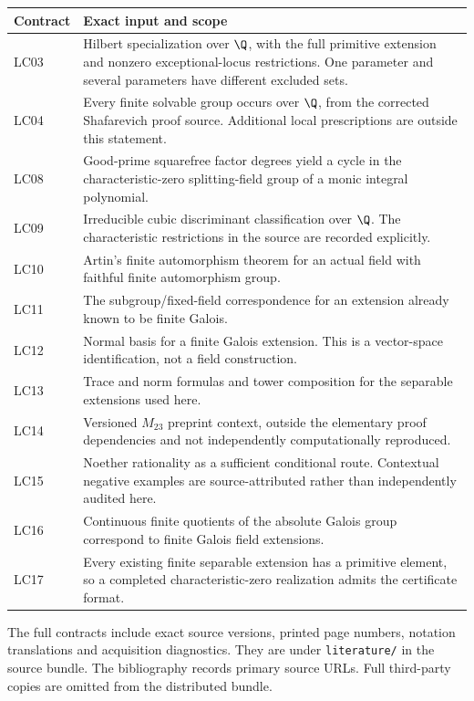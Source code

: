 \begin{longtable}{@{}p{.12\linewidth}p{.79\linewidth}@{}}
\toprule Contract & Exact input and scope\\\midrule\endhead
LC03 & Hilbert specialization over $\Q$, with the full primitive extension and nonzero exceptional-locus restrictions. One parameter and several parameters have different excluded sets.\\[4pt]
LC04 & Every finite solvable group occurs over $\Q$, from the corrected Shafarevich proof source. Additional local prescriptions are outside this statement.\\[4pt]
LC08 & Good-prime squarefree factor degrees yield a cycle in the characteristic-zero splitting-field group of a monic integral polynomial.\\[4pt]
LC09 & Irreducible cubic discriminant classification over $\Q$. The characteristic restrictions in the source are recorded explicitly.\\[4pt]
LC10 & Artin's finite automorphism theorem for an actual field with faithful finite automorphism group.\\[4pt]
LC11 & The subgroup/fixed-field correspondence for an extension already known to be finite Galois.\\[4pt]
LC12 & Normal basis for a finite Galois extension. This is a vector-space identification, not a field construction.\\[4pt]
LC13 & Trace and norm formulas and tower composition for the separable extensions used here.\\[4pt]
LC14 & Versioned $M_{23}$ preprint context, outside the elementary proof dependencies and not independently computationally reproduced.\\[4pt]
LC15 & Noether rationality as a sufficient conditional route. Contextual negative examples are source-attributed rather than independently audited here.\\[4pt]
LC16 & Continuous finite quotients of the absolute Galois group correspond to finite Galois field extensions.\\[4pt]
LC17 & Every existing finite separable extension has a primitive element, so a completed characteristic-zero realization admits the certificate format.\\
\bottomrule
\end{longtable}

The full contracts include exact source versions, printed page numbers, notation translations and acquisition diagnostics. They are under \texttt{literature/} in the source bundle. The bibliography records primary source URLs. Full third-party copies are omitted from the distributed bundle.

